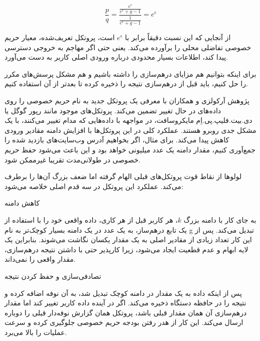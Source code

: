 \begin{equation}
\frac{p}{q} = \frac{ \frac{e^\epsilon}{e^\epsilon + g - 1} }{ \frac{1}{e^\epsilon + g - 1} } = e^\epsilon
\label{equ:worstCaseLDP}
\end{equation}

از آنجایی که این نسبت دقیقاً برابر با $e^\epsilon$ است، پروتکل تعریف‌شده، معیار حریم خصوصی تفاضلی محلی را برآورده می‌کند. یعنی حتی اگر مهاجم به خروجی دسترسی پیدا کند، اطلاعات بسیار محدودی درباره ورودی اصلی کاربر به دست می‌آورد.



برای اینکه بتوانیم هم مزایای درهم‌سازی را داشته باشیم و هم مشکل پرسش‌های مکرر را حل کنیم، باید قبل از درهم‌سازی نتیجه را ذخیره کرده تا بعد‌تر از آن استفاده کنیم.


پژوهش آرکولزی و همکاران  با معرفی یک پروتکل جدید به نام  حریم خصوصی را روی داده‌های در حال تغییر تضمین می‌کند. پروتکل‌های موجود مانند رپور گوگل یا دی.بیت.فلیپ.پی.اِم مایکروسافت، در مواجهه با داده‌هایی که مدام تغییر می‌کنند، با یک مشکل جدی روبرو هستند. عملکرد کلی در این پروتکل‌ها با افزایش دامنه مقادیر ورودی کاهش پیدا می‌کند. برای مثال، اگر بخواهیم آدرس وب‌سایت‌های بازدید شده را جمع‌آوری کنیم، مقدار دامنه یک عدد میلیونی خواهد بود و این باعث می‌شود حفظ حریم خصوصی در طولانی‌مدت تقریبا غیرممکن شود.

لولوها از نقاط قوت پروتکل‌های قبلی الهام گرفته اما ضعف بزرگ آن‌ها را برطرف می‌کند. عملکرد این پروتکل در سه قدم اصلی خلاصه می‌شود:


 کاهش دامنه

به جای کار با دامنه بزرگ $k$، هر کاربر قبل از هر کاری، داده واقعی خود را با استفاده از یک تابع درهم‌ساز، به یک عدد در یک دامنه بسیار کوچک‌تر به نام g تبدیل می‌کند. پس از این کار تعداد زیادی از مقادیر اصلی به یک مقدار یکسان نگاشت می‌شوند. بنابراین یک لایه ابهام و عدم قطعیت ایجاد می‌شود، زیرا کارپذیر حتی با داشتن نتیجه درهم‌سازی، مقدار واقعی را نمی‌داند.

 تصادفی‌سازی و حفظ کردن نتیجه

پس از اینکه داده به یک مقدار در دامنه کوچک تبدیل شد، به آن نوفه اضافه کرده و نتیجه را در حافظه دستگاه ذخیره می‌کند. اگر در آینده داده کاربر تغییر کند اما مقدار درهم‌سازی آن همان مقدار قبلی باشد، پروتکل همان گزارش نوفه‌دار قبلی را دوباره ارسال می‌کند. این کار از هدر رفتن بودجه حریم خصوصی جلوگیری کرده و سرعت عملیات را بالا می‌برد.

